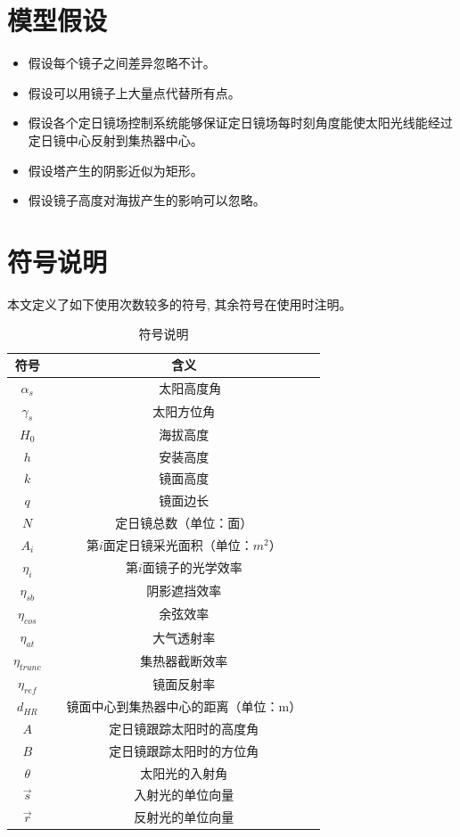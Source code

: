 \documentclass[withoutpreface,bwprint]{cumcmthesis}
\begin{document}
\section{模型假设}
\begin{itemize}
	\item [(1)] 
	假设每个镜子之间差异忽略不计。
	\item [(2)]
	假设可以用镜子上大量点代替所有点。
	\item [(3)]
	假设各个定日镜场控制系统能够保证定日镜场每时刻角度能使太阳光线能经过定日镜中心反射到集热器中心。
	\item [(4)]
	假设塔产生的阴影近似为矩形。
	\item [(5)]
	假设镜子高度对海拔产生的影响可以忽略。
\end{itemize}  

\section{符号说明}
本文定义了如下使用次数较多的符号, 其余符号在使用时注明。
	\begin{longtable}{cc}
		\caption{符号说明}\label{tab:001} \\
		\toprule[1.5pt]
		符号 & 含义\\
		\midrule[1pt]
		$\alpha_s$ & \ \ 太阳高度角\\
		$\gamma_s$ & 太阳方位角\\
		$H_0$ & 海拔高度\\
		$ h$ & 安装高度\\
		$ k $ & 镜面高度 \\
		$ q $ & 镜面边长\\             
		$N$ & 定日镜总数（单位：面）\\
		$A_{i}$ & 第$i$面定日镜采光面积（单位：$m^2$）\\
		$\eta_{i}$ & 第$i$面镜子的光学效率\\ 
		$\eta_{sb}$ & 阴影遮挡效率\\
		$\eta_{cos}$ & 余弦效率\\
		$\eta_{at}$ & 大气透射率\\
		$\eta_{trunc}$ & 集热器截断效率\\
		$\eta_{ref}$ & 镜面反射率\\
		$d_{HR}$ & \ \ 镜面中心到集热器中心的距离（单位：m）\ \ \\
		$A$ & 定日镜跟踪太阳时的高度角 \\
		$B$ & 定日镜跟踪太阳时的方位角 \\
		$ \theta $ & 太阳光的入射角 \\
		$ \overrightarrow{s} $ & 入射光的单位向量 \\
		$ \overrightarrow{r} $ & 反射光的单位向量\\
		\bottomrule[1.5pt]
	\end{longtable}
\end{document}
